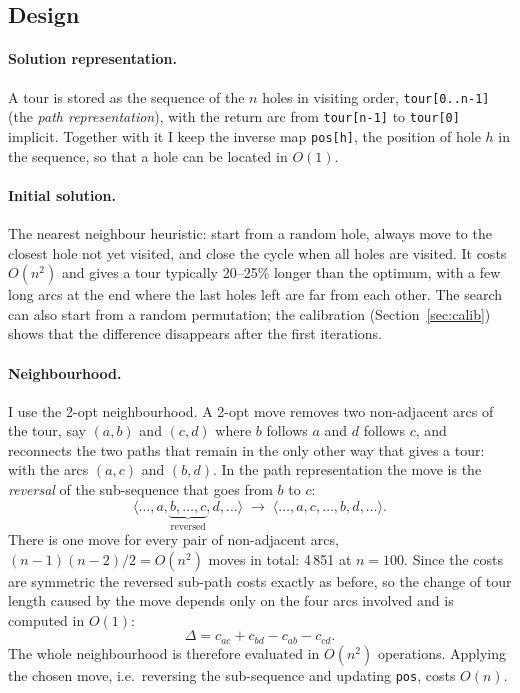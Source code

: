 \documentclass[11pt,a4paper]{article}
\begin{document}
\subsection{Design}\label{sec:design}
\paragraph{Solution representation.}
A tour is stored as the sequence of the $n$ holes in visiting order, \texttt{tour[0..n-1]}
(the \emph{path representation}), with the return arc from \texttt{tour[n-1]} to
\texttt{tour[0]} implicit. Together with it I keep the inverse map \texttt{pos[h]}, the
position of hole $h$ in the sequence, so that a hole can be located in $O(1)$.

\paragraph{Initial solution.}
The nearest neighbour heuristic: start from a random hole, always move to the closest hole
not yet visited, and close the cycle when all holes are visited. It costs $O(n^2)$ and gives a
tour typically 20--25\% longer than the optimum, with a few long arcs at the end where the
last holes left are far from each other. The search can also start from a random permutation;
the calibration (Section~\ref{sec:calib}) shows that the difference disappears after the
first iterations.

\paragraph{Neighbourhood.}
I use the 2-opt neighbourhood. A 2-opt move removes two non-adjacent arcs of the tour, say
$(a,b)$ and $(c,d)$ where $b$ follows $a$ and $d$ follows $c$, and reconnects the two paths
that remain in the only other way that gives a tour: with the arcs $(a,c)$ and $(b,d)$. In the
path representation the move is the \emph{reversal} of the sub-sequence that goes from $b$ to
$c$:
\[
  \langle \dots,a,\underbrace{b,\dots,c}_{\text{reversed}},d,\dots\rangle
  \;\longrightarrow\;
  \langle \dots,a,c,\dots,b,d,\dots\rangle .
\]
There is one move for every pair of non-adjacent arcs, $(n-1)(n-2)/2=O(n^2)$ moves in total:
4\,851 at $n=100$. Since the costs are symmetric the reversed sub-path costs exactly as
before, so the change of tour length caused by the move depends only on the four arcs
involved and is computed in $O(1)$:
\[
  \Delta = c_{ac} + c_{bd} - c_{ab} - c_{cd}.
\]
The whole neighbourhood is therefore evaluated in $O(n^2)$ operations. Applying the chosen
move, i.e.\ reversing the sub-sequence and updating \texttt{pos}, costs $O(n)$.
\end{document}
